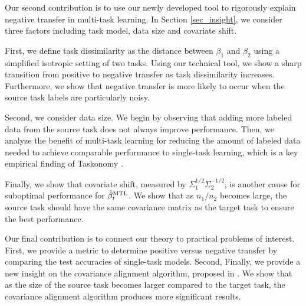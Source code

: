 Our second contribution is to use our newly developed tool to rigorously explain negative transfer in multi-task learning.
In Section \ref{sec_insight}, we consider three factors including task model, data size and covariate shift.
\squishlist
		\item First, we define task dissimilarity as the distance between $\beta_1$ and $\beta_2$ using a simplified isotropic setting of two tasks.
		Using our technical tool, we show a sharp transition from positive to negative transfer as task dissimilarity increases.
		Furthermore, we show that negative transfer is more likely to occur when the source task labels are particularly noisy.
		\item Second, we consider data size.
	We begin by observing that adding more labeled data from the source task does not always improve performance.
	Then, we analyze the benefit of multi-task learning for reducing the amount of labeled data needed to achieve comparable performance to single-task learning, which is a key empirical finding of Taskonomy \cite{ZSSGM18}.
		\item Finally, we show that covariate shift, measured by $\Sigma_1^{1/2}\Sigma_2^{-1/2}$, is another cause for suboptimal performance for $\hat{\beta}_t^{\text{MTL}}$.
		We show that as $n_1 / n_2$ becomes large, the source task should have the same covariance matrix as the target task to ensure the best performance.
\squishend

Our final contribution is to connect our theory to practical problems of interest.
First, we provide a metric to determine positive versus negative transfer by comparing the test accuracies of single-task models.
Second, \todo{}
Finally, we provide a new insight on the covariance alignment algorithm, proposed in \cite{WZR20}.
We show that as the size of the source task becomes larger compared to the target task, the covariance alignment algorithm produces more significant results.


